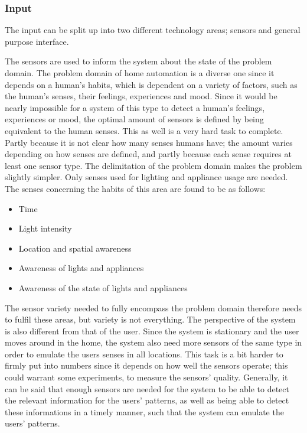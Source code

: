 \subsubsection{Input}
The input can be split up into two different technology areas; sensors and general purpose interface.

The sensors are used to inform the system about the state of the problem domain. The problem domain of home automation is a diverse one since it depends on a human's habits, which is dependent on a variety of factors, such as the human's senses, their feelings, experiences and mood. Since it would be nearly impossible for a system of this type to detect a human's feelings, experiences or mood, the optimal amount of sensors is defined by being equivalent to the human senses. This as well is a very hard task to complete. Partly because it is not clear how many senses humans have; the amount varies depending on how senses are defined, and partly because each sense requires at least one sensor type. The delimitation of the problem domain makes the problem slightly simpler. Only senses used for lighting and appliance usage are needed. The senses concerning the habits of this area are found to be as follows:
\begin{itemize}
	\item Time
	\item Light intensity
	\item Location and spatial awareness
	\item Awareness of lights and appliances
  \item Awareness of the state of lights and appliances
\end{itemize}
The sensor variety needed to fully encompass the problem domain therefore needs to fulfil these areas, but variety is not everything. The perspective of the system is also different from that of the user. Since the system is stationary and the user moves around in the home, the system also need more sensors of the same type in order to emulate the users senses in all locations. This task is a bit harder to firmly put into numbers since it depends on how well the sensors operate; this could warrant some experiments, to measure the sensors' quality. Generally, it can be said that enough sensors are needed for the system to be able to detect the relevant information for the users' patterns, as well as being able to detect these informations in a timely manner, such that the system can emulate the users' patterns.

